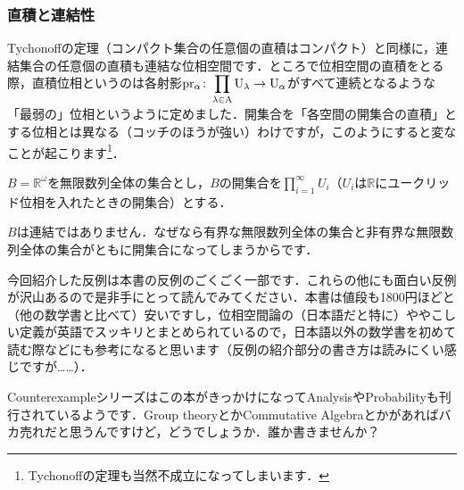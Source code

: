 \subsubsection*{直積と連結性}
Tychonoffの定理（コンパクト集合の任意個の直積はコンパクト）と同様に，連結集合の任意個の直積も連結な位相空間です．ところで位相空間の直積をとる際，直積位相というのは各射影$\rm{pr_{\alpha}}\colon\displaystyle \prod_{\lambda\in A} U_\lambda\to U_\alpha$がすべて連続となるような「最弱の」位相というように定めました．開集合を「各空間の開集合の直積」とする位相とは異なる（コッチのほうが強い）わけですが，このようにすると変なことが起こります\footnote{Tychonoffの定理も当然不成立になってしまいます．}．
\begin{ex}
$B=\mathbb{R}^\omega$を無限数列全体の集合とし，$B$の開集合を$\displaystyle \prod_{i=1}^{\infty} U_i$（$U_i$は$\mathbb{R}$にユークリッド位相を入れたときの開集合）とする．
\end{ex}
$B$は連結ではありません．なぜなら有界な無限数列全体の集合と非有界な無限数列全体の集合がともに開集合になってしまうからです．

今回紹介した反例は本書の反例のごくごく一部です．これらの他にも面白い反例が沢山あるので是非手にとって読んでみてください．本書は値段も1800円ほどと（他の数学書と比べて）安いですし，位相空間論の（日本語だと特に）ややこしい定義が英語でスッキリとまとめられているので，日本語以外の数学書を初めて読む際などにも参考になると思います（反例の紹介部分の書き方は読みにくい感じですが……）．\par
Counterexampleシリーズはこの本がきっかけになってAnalysisやProbabilityも刊行されているようです．Group theoryとかCommutative Algebraとかがあればバカ売れだと思うんですけど，どうでしょうか．誰か書きませんか？
